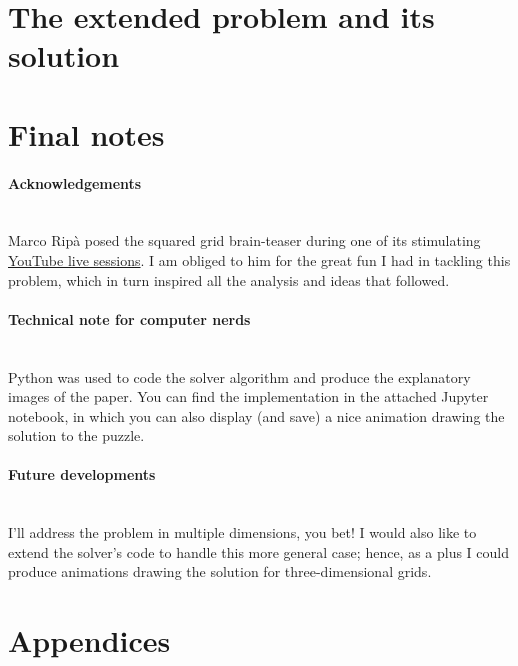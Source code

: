 \documentclass[11pt]{article}
\begin{document}
\hypertarget{the-extended-problem-and-its-solution} {
	\section{The extended problem and its solution}
	\label{the-extended-problem-and-its-solution}
}
%

\hypertarget{final-notes}{
	\section{Final notes}
	\label{final-notes}
}

\paragraph{Acknowledgements} \mbox{} \\ %
Marco Ripà posed the squared grid brain-teaser during one of its stimulating \href{https://www.youtube.com/watch?v=rh-ONRXcHok}{YouTube live sessions}. I am obliged to him for the great fun I had in tackling this problem, which in turn inspired all the analysis and ideas that followed.

\paragraph{Technical note for computer nerds} \mbox{} \\
Python was used to code the solver algorithm and produce the explanatory images of the paper. You can find the implementation in the attached Jupyter notebook, in which you can also display (and save) a nice animation drawing the solution to the puzzle.

\paragraph{Future developments} \mbox{} \\
I'll address the problem in multiple dimensions, you bet! I would also like to extend the solver's code to handle this more general case; hence, as a plus I could produce animations drawing the solution for three-dimensional grids.

\hypertarget{appendices}{
	\section{Appendices}
	\label{appendices}
}
\end{document}
